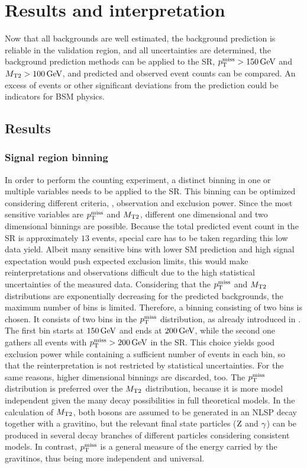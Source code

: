 \chapter{Results and interpretation}\label{chap:results}
\minitoc
Now that all backgrounds are well estimated, the background prediction is reliable in the validation region, and all uncertainties are determined, the background prediction methods can be applied to the SR, $p_{\mathrm{T}}^\text{miss}>150\,\text{Ge\hspace{-.08em}V}$ and $M_{\mathrm{T2}}>100\,\text{Ge\hspace{-.08em}V}$, and predicted and observed event counts can be compared. An excess of events or other significant deviations from the prediction could be indicators for BSM physics.
\section{Results}\label{sec:results}
\subsection*{Signal region binning}
In order to perform the counting experiment, a distinct binning in one or multiple variables needs to be applied to the SR. This binning can be optimized considering different criteria, \eg, observation and exclusion power. Since the most sensitive variables are $p_{\mathrm{T}}^\text{miss}$ and $M_{\mathrm{T2}}$, different one dimensional and two dimensional binnings are possible.
Because the total predicted event count in the SR is approximately $13$ events, special care has to be taken regarding this low data yield. Albeit many sensitive bins with lower SM prediction and high signal expectation would push expected exclusion limits, this would make reinterpretations and observations difficult due to the high statistical uncertainties of the measured data. Considering that the $p_{\mathrm{T}}^\text{miss}$ and $M_{\mathrm{T2}}$ distributions are exponentially decreasing for the predicted backgrounds, the maximum number of bins is limited. Therefore, a binning consisting of two bins is chosen. It consists of two bins in the $p_{\mathrm{T}}^\text{miss}$ distribution, as already introduced in . The first bin starts at $150\,\text{Ge\hspace{-.08em}V}$ and ends at $200\,\text{Ge\hspace{-.08em}V}$, while the second one gathers all events with $p_{\mathrm{T}}^\text{miss}>200\,\text{Ge\hspace{-.08em}V}$ in the SR. This choice yields good exclusion power while containing a sufficient number of events in each bin, so that the reinterpretation is not restricted by statistical uncertainties. For the same reasons, higher dimensional binnings are discarded, too. The $p_{\mathrm{T}}^\text{miss}$ distribution is preferred over the $M_{\mathrm{T2}}$ distribution, because it is more model independent given the many decay possibilities in full theoretical models. In the calculation of $M_{\mathrm{T2}}$, both bosons are assumed to be generated in an NLSP decay together with a gravitino, but the relevant final state particles ($\mathrm{Z}$ and $\gamma$) can be produced in several decay branches of different particles considering consistent models. In contrast, $p_{\mathrm{T}}^\text{miss}$ is a general measure of the energy carried by the gravitinos, thus being more independent and universal.
